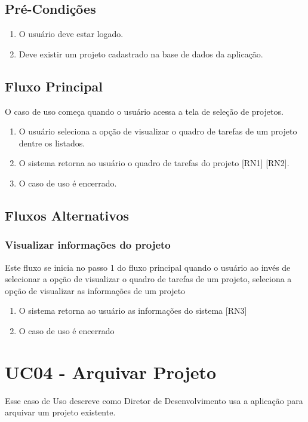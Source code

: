 \subsection{Pré-Condições}

\begin{enumerate}
  \item O usuário deve estar logado.
  \item Deve existir um projeto cadastrado na base de dados da aplicação.
\end{enumerate}

\subsection{Fluxo Principal}
O caso de uso começa quando o usuário acessa a tela de seleção de projetos.

\begin{enumerate}
  \item O usuário seleciona a opção de visualizar o quadro de tarefas de um projeto dentre os listados.
  \item O sistema retorna ao usuário o quadro de tarefas do projeto [RN1] [RN2].
  \item O caso de uso é encerrado.
\end{enumerate}

\subsection{Fluxos Alternativos}

\subsubsection{Visualizar informações do projeto}
Este fluxo se inicia no passo 1 do fluxo principal quando o usuário ao invés de selecionar a opção de visualizar o quadro de tarefas de um projeto, seleciona a opção de visualizar as informações de um projeto

\begin{enumerate}
  \item O sistema retorna ao usuário as informações do sistema [RN3]
  \item O caso de uso é encerrado
\end{enumerate}

\section{UC04 - Arquivar Projeto}
Esse caso de Uso descreve como Diretor de Desenvolvimento usa a aplicação para arquivar um projeto existente.

